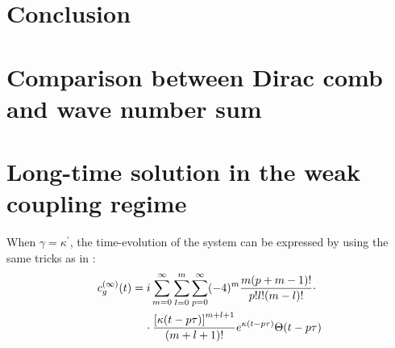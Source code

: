 \documentclass[%
 reprint,
 amsmath,amssymb,
pra,
]{revtex4-1}
\def\kappap{{\kappa^\prime}}
\def\nn{\nonumber}
\newcommand{\lsz}{\left[}
\newcommand{\rsz}{\right]}
\newcommand\note[1]{{\color{red}{#1}}}
\begin{document}
\section{Conclusion}

\appendix
\section{Comparison between Dirac comb and wave number sum}
\note{Here we can put a plot to show how these two cases match each other.}

\section{Long-time solution in the weak coupling regime}
When $\gamma=\kappap$, the time-evolution of the system can be expressed by using the same tricks as in \cite{Kabuss2015}: \note{Recalculate this!}
\begin{align}
\label{eq:analytic}
c_g^{(\infty)}(t) &= i\sum_{m=0}^\infty\sum_{l=0}^m\sum_{p=0}^\infty(-4)^m\frac{m(p+m-1)!}{p!l!(m-l)!}\cdot\nn\\
&\hspace{.4cm}\cdot\frac{\lsz\kappa(t-p\tau)\rsz^{m+l+1}}{(m+l+1)!}e^{\kappa(t-p\tau)}\Theta(t-p\tau)
\end{align}

\note{Compare with single-delay case}


\end{document}
